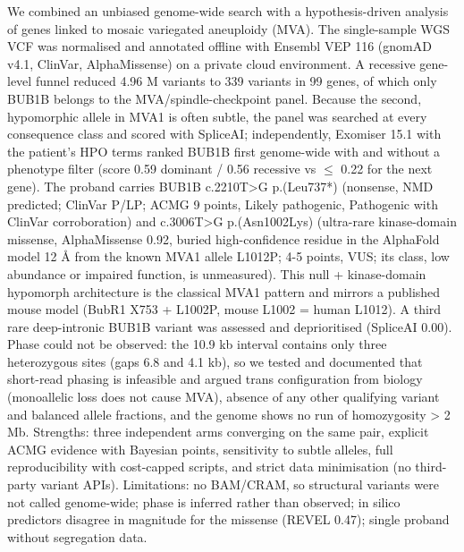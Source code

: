 \begin{description}[leftmargin=0pt,style=nextline,itemsep=4pt,font=\sffamily\bfseries\small\color{branddark}]
\item[Provide a method abstract (up to 500 words). Please include strengths and limitations of your method as well as methodological detail.] We combined an unbiased genome-wide search with a hypothesis-driven analysis of genes linked to mosaic variegated aneuploidy (MVA). The single-sample WGS VCF was normalised and annotated offline with Ensembl VEP 116 (gnomAD v4.1, ClinVar, AlphaMissense) on a private cloud environment. A recessive gene-level funnel reduced 4.96 M variants to 339 variants in 99 genes, of which only BUB1B belongs to the MVA/spindle-checkpoint panel. Because the second, hypomorphic allele in MVA1 is often subtle, the panel was searched at every consequence class and scored with SpliceAI; independently, Exomiser 15.1 with the patient's HPO terms ranked BUB1B first genome-wide with and without a phenotype filter (score 0.59 dominant / 0.56 recessive vs $\leq$ 0.22 for the next gene). The proband carries BUB1B c.2210T>G p.(Leu737*) (nonsense, NMD predicted; ClinVar P/LP; ACMG 9 points, Likely pathogenic, Pathogenic with ClinVar corroboration) and c.3006T>G p.(Asn1002Lys) (ultra-rare kinase-domain missense, AlphaMissense 0.92, buried high-confidence residue in the AlphaFold model 12 Å from the known MVA1 allele L1012P; 4-5 points, VUS; its class, low abundance or impaired function, is unmeasured). This null + kinase-domain hypomorph architecture is the classical MVA1 pattern and mirrors a published mouse model (BubR1 X753 + L1002P, mouse L1002 = human L1012). A third rare deep-intronic BUB1B variant was assessed and deprioritised (SpliceAI 0.00). Phase could not be observed: the 10.9 kb interval contains only three heterozygous sites (gaps 6.8 and 4.1 kb), so we tested and documented that short-read phasing is infeasible and argued trans configuration from biology (monoallelic loss does not cause MVA), absence of any other qualifying variant and balanced allele fractions, and the genome shows no run of homozygosity > 2 Mb. Strengths: three independent arms converging on the same pair, explicit ACMG evidence with Bayesian points, sensitivity to subtle alleles, full reproducibility with cost-capped scripts, and strict data minimisation (no third-party variant APIs). Limitations: no BAM/CRAM, so structural variants were not called genome-wide; phase is inferred rather than observed; in silico predictors disagree in magnitude for the missense (REVEL 0.47); single proband without segregation data.
\end{description}
